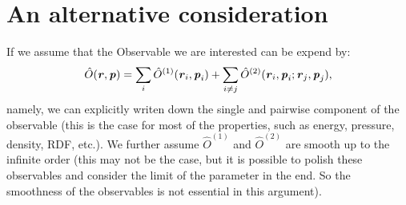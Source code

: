 \documentclass[aps,pre,preprint,unsortedaddress]{revtex4}
\renewcommand{\v}[1]{\textbf{\textit{#1}}}
\begin{document}
\section{An alternative consideration}
If we assume that the Observable we are interested can be expend by:
\begin{align}
  \hat O(\v r, \v p) =
  \sum_i\hat O^{(1)}(\v r_i, \v p_i) +
  \sum_{i\neq j}\hat O^{(2)}(\v r_i, \v p_i; \v r_j, \v p_j),
\end{align}
namely, we can explicitly writen down the single and pairwise
component of the observable (this is the case for most of the
properties, such as energy, pressure, density, RDF, etc.). We further
assume $\hat O^{(1)}$ and $\hat O^{(2)}$ are smooth up to the infinite
order (this may not be the case, but it is possible to polish these
observables and consider the limit of the parameter in the end. So the
smoothness of the observables is not essential in this argument).
\end{document}
